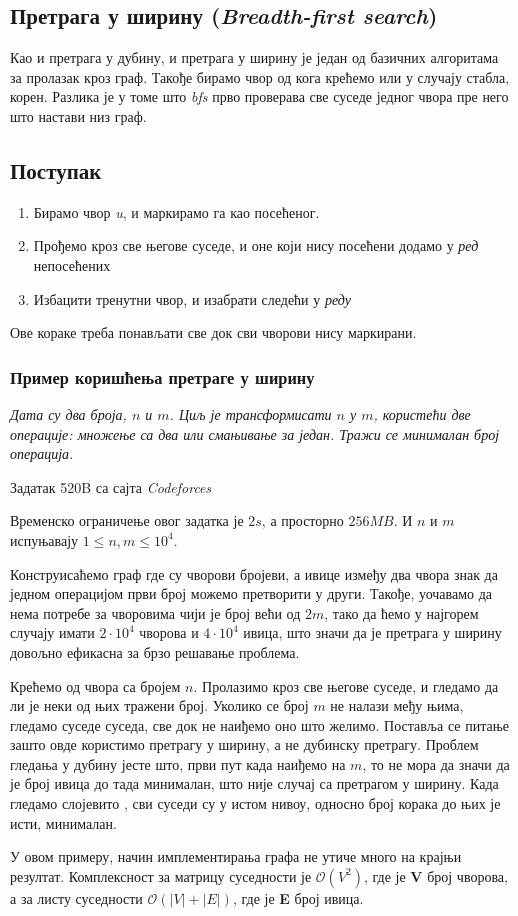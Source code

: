 \documentclass[11pt, oneside, a4paper]{article}
\begin{document}
\subsection{Претрага у ширину (\textit{Breadth-first search})}
Као и претрага у дубину, и претрага у ширину је један од базичних алгоритама за пролазак кроз граф. Такође бирамо чвор од кога крећемо или у случају стабла, корен. Разлика је у томе што \textit{bfs} прво проверава све суседе једног чвора пре него што настави низ граф. 
\subsection*{Поступак}
\begin{enumerate}
    \item Бирамо чвор \textit{u}, и маркирамо га као посећеног. 
    \item Прођемо кроз све његове суседе, и оне који нису посећени додамо у \textit{ред} непосећених
    \item Избацити тренутни чвор, и изабрати следећи у \textit{реду}
\end{enumerate}
Ове кораке треба понављати све док сви чворови нису маркирани.
\subsubsection*{Пример коришћења претраге у ширину}
\setlength{\epigraphwidth}{0.75\textwidth}
\epigraph{\textit{Дата су два броја, $n$ и $m$. Циљ је трансформисати $n$ у $m$, користећи две операције: множење са два или смањивање за један. Тражи се минималан број операција.}}{Задатак 520B са сајта \textit{Codeforces}}
Временско ограничење овог задатка је $2s$, а просторно $256 MB$. И $n$ и $m$ испуњавају $1 \leqslant n, m \leqslant 10^4$. \par
Конструисаћемо граф где су чворови бројеви, а ивице између два чвора знак да једном операцијом први број можемо претворити у други. Такође, уочавамо да нема потребе за чворовима чији је број већи од $2m$, тако да ћемо у најгорем случају имати $2 \cdot 10^4$ чворова и $4 \cdot 10^4$ ивица, што значи да је претрага у ширину довољно ефикасна за брзо решавање проблема. \par Крећемо од чвора са бројем $n$. Пролазимо кроз све његове суседе, и гледамо да ли је неки од њих тражени број. Уколико се број $m$ не налази међу њима, гледамо суседе суседа, све док не наиђемо оно што желимо. Поставља се питање зашто овде користимо претрагу у ширину, а не дубинску претрагу. Проблем гледања у дубину јесте што, први пут када наиђемо на $m$, то не мора да значи да је број ивица до тада минималан, што није случај са претрагом у ширину. Када гледамо \glqq слојевито \grqq, сви суседи су у истом нивоу, односно број корака до њих је исти, минималан. \par У овом примеру, начин имплементирања графа не утиче много на крајњи резултат. Комплексност за матрицу суседности је $\mathcal{O}(V^2)$, где је \textbf{V} број чворова, а за листу суседности $\mathcal{O}(|V| + |E|)$, где је \textbf{E} број ивица.
\end{document}
